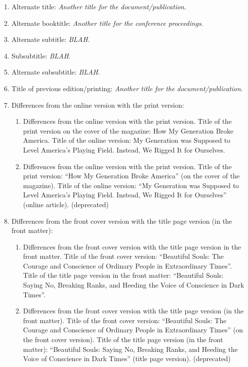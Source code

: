 \documentclass[letter,12pt]{article}
\begin{document}
\begin{enumerate}
\begin{enumerate}
		\begin{enumerate} \itemsep -2pt
		\item Alternate title: {\it Another title for the document/publication}.
		\item Alternate booktitle: {\it Another title for the conference proceedings}.
		\item Alternate subtitle: {\it BLAH}.
		\item Subsubtitle: {\it BLAH}.
		\item Alternate subsubtitle: {\it BLAH}.
		\item Title of previous edition/printing: {\it Another title for the document/publication}.
		\item Differences from the online version with the print version: \vspace{-0.1cm}
			\begin{enumerate} \itemsep -1pt
			\item Differences from the online version with the print version. Title of the print version on the cover of the magazine: How My Generation Broke America. Title of the online version: My Generation was Supposed to Level America's Playing Field. Instead, We Rigged It for Ourselves.
			\item Differences from the online version with the print version. Title of the print version: ``How My Generation Broke America'' (on the cover of the magazine). Title of the online version: ``My Generation was Supposed to Level America's Playing Field. Instead, We Rigged It for Ourselves'' (online article). (deprecated)
			\end{enumerate}
		\item Differences from the front cover version with the title page version (in the front matter): \vspace{-0.1cm}
			\begin{enumerate} \itemsep -1pt
			\item Differences from the front cover version with the title page version in the front matter. Title of the front cover version: ``Beautiful Souls: The Courage and Conscience of Ordinary People in Extraordinary Times''. Title of the title page version in the front matter: ``Beautiful Souls: Saying No, Breaking Ranks, and Heeding the Voice of Conscience in Dark Times''.
			\item Differences from the front cover version with the title page version (in the front matter). Title of the front cover version: ``Beautiful Souls: The Courage and Conscience of Ordinary People in Extraordinary Times'' (on the front cover version). Title of the title page version (in the front matter): ``Beautiful Souls: Saying No, Breaking Ranks, and Heeding the Voice of Conscience in Dark Times'' (title page version). (deprecated)

\end{enumerate}
\end{enumerate}
\end{enumerate}
\end{enumerate}
\end{document}
